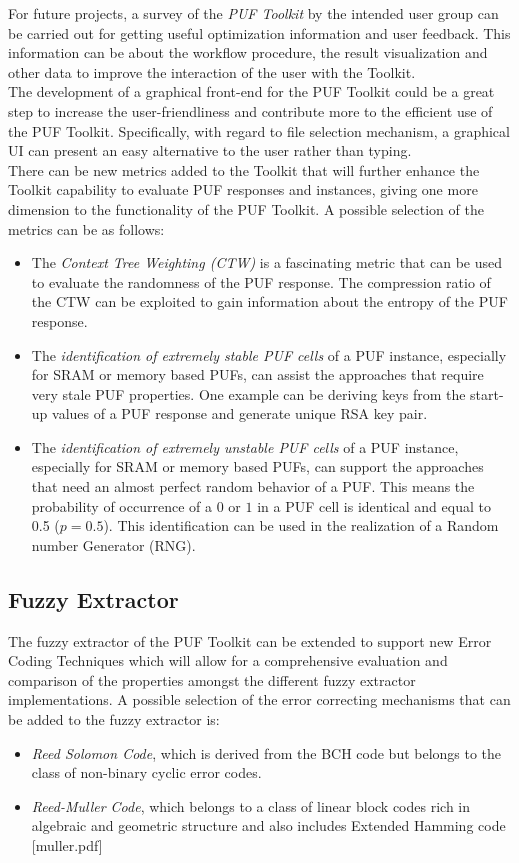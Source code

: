 For future projects, a survey of the \emph{PUF Toolkit} by the intended user group can be carried out for getting useful optimization information and user feedback. This information can be about the workflow procedure, the result visualization and other data to improve the interaction of the user with the Toolkit.\\

The development of a graphical front-end for the PUF Toolkit could be a great step to increase the user-friendliness and contribute more to the efficient use of the PUF Toolkit. Specifically, with regard to file selection mechanism, a graphical UI can present an easy alternative to the user rather than typing.\\

There can be new metrics added to the Toolkit that will further enhance the Toolkit capability to evaluate PUF responses and instances, giving one more dimension to the functionality of the PUF Toolkit. A possible selection of the metrics can be as follows:
\begin{itemize}
\item The \emph{Context Tree Weighting (CTW)} is a fascinating metric that can be used to evaluate the randomness of the PUF response. The compression ratio of the CTW can be exploited to gain information about the entropy of the PUF response.
\item The \emph{identification of extremely stable PUF cells} of a PUF instance, especially for SRAM or memory based PUFs, can assist the approaches that require very stale PUF properties. One example can be deriving keys from the start-up values of a PUF response and generate unique RSA key pair.
\item The \emph{identification of extremely unstable PUF cells} of a PUF instance, especially for SRAM or memory based PUFs, can support the approaches that need an almost perfect random behavior of a PUF. This means the probability of occurrence of a $0$ or $1$ in a PUF cell is identical and equal to 0.5 ($p = 0.5$). This identification can be used in the realization of a Random number Generator (RNG).
\end{itemize}

\subsection{Fuzzy Extractor}
The fuzzy extractor of the PUF Toolkit can be extended to support new Error Coding Techniques which will allow for a comprehensive evaluation and comparison of the properties amongst the different fuzzy extractor implementations. A possible selection of the error correcting mechanisms that can be added to the fuzzy extractor is:
\begin{itemize}
\item \emph{Reed Solomon Code}, which is derived from the BCH code but belongs to the class of non-binary cyclic error codes.
\item \emph{Reed-Muller Code}, which belongs to a class of linear block codes rich in algebraic and geometric structure and also includes Extended Hamming code [muller.pdf]
\end{itemize}


